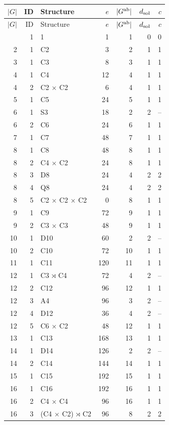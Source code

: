 {\small
\begin{longtable}{rrlrrrr}
\toprule $|G|$&ID&Structure&$e$&$|G^{\rm ab}|$&$d_{\rm sol}$&$c$\\\midrule
\endfirsthead
\toprule $|G|$&ID&Structure&$e$&$|G^{\rm ab}|$&$d_{\rm sol}$&$c$\\\midrule
\endhead
\bottomrule\endfoot
1 & 1 & 1 & 1 & 1 & 0 & 0\\
2 & 1 & C2 & 3 & 2 & 1 & 1\\
3 & 1 & C3 & 8 & 3 & 1 & 1\\
4 & 1 & C4 & 12 & 4 & 1 & 1\\
4 & 2 & C2 $\times$ C2 & 6 & 4 & 1 & 1\\
5 & 1 & C5 & 24 & 5 & 1 & 1\\
6 & 1 & S3 & 18 & 2 & 2 & --\\
6 & 2 & C6 & 24 & 6 & 1 & 1\\
7 & 1 & C7 & 48 & 7 & 1 & 1\\
8 & 1 & C8 & 48 & 8 & 1 & 1\\
8 & 2 & C4 $\times$ C2 & 24 & 8 & 1 & 1\\
8 & 3 & D8 & 24 & 4 & 2 & 2\\
8 & 4 & Q8 & 24 & 4 & 2 & 2\\
8 & 5 & C2 $\times$ C2 $\times$ C2 & 0 & 8 & 1 & 1\\
9 & 1 & C9 & 72 & 9 & 1 & 1\\
9 & 2 & C3 $\times$ C3 & 48 & 9 & 1 & 1\\
10 & 1 & D10 & 60 & 2 & 2 & --\\
10 & 2 & C10 & 72 & 10 & 1 & 1\\
11 & 1 & C11 & 120 & 11 & 1 & 1\\
12 & 1 & C3 $\rtimes$ C4 & 72 & 4 & 2 & --\\
12 & 2 & C12 & 96 & 12 & 1 & 1\\
12 & 3 & A4 & 96 & 3 & 2 & --\\
12 & 4 & D12 & 36 & 4 & 2 & --\\
12 & 5 & C6 $\times$ C2 & 48 & 12 & 1 & 1\\
13 & 1 & C13 & 168 & 13 & 1 & 1\\
14 & 1 & D14 & 126 & 2 & 2 & --\\
14 & 2 & C14 & 144 & 14 & 1 & 1\\
15 & 1 & C15 & 192 & 15 & 1 & 1\\
16 & 1 & C16 & 192 & 16 & 1 & 1\\
16 & 2 & C4 $\times$ C4 & 96 & 16 & 1 & 1\\
16 & 3 & (C4 $\times$ C2) $\rtimes$ C2 & 96 & 8 & 2 & 2\\

\end{longtable}}
